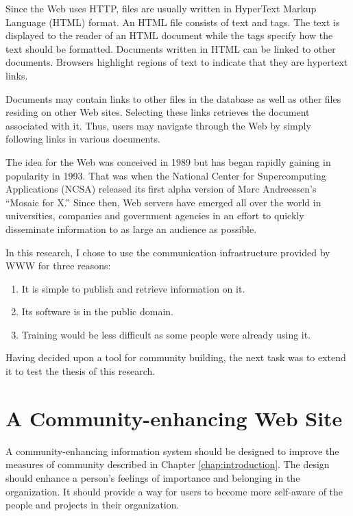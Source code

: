 Since the Web uses HTTP, files are usually written in HyperText Markup Language
(HTML) format.  An HTML file consists of text and tags.  The text is displayed
to the reader of an HTML document while the tags specify how the text should be
formatted.  Documents written in HTML can be linked to other documents.
Browsers highlight regions of text to indicate that they are hypertext links.

Documents may contain links to other files in the database as well as other
files residing on other Web sites.  Selecting these links retrieves the
document associated with it.  Thus, users may navigate through the Web by
simply following links in various documents.

The idea for the Web was conceived in 1989 but has began rapidly gaining in
popularity in 1993.  That was when the National Center for Supercomputing
Applications (NCSA) released its first alpha version of Marc Andreessen's
``Mosaic for X.''  Since then, Web servers have emerged all over the world in
universities, companies and government agencies in an effort to quickly
disseminate information to as large an audience as possible.

In this research, I chose to use the communication infrastructure provided by
WWW for three reasons:

\begin{enumerate}
\item{It is simple to publish and retrieve information on it.}
\item{Its software is in the public domain.}
\item{Training would be less difficult as some people were already using it.}
\end{enumerate}

Having decided upon a tool for community building, the next task was to extend
it to test the thesis of this research.

\section{A Community-enhancing Web Site}
\label{sec:design}
A community-enhancing information system should be designed to improve the
measures of community described in Chapter \ref{chap:introduction}.  The design
should enhance a person's feelings of importance and belonging in the
organization.  It should provide a way for users to become more self-aware of
the people and projects in their organization.  

